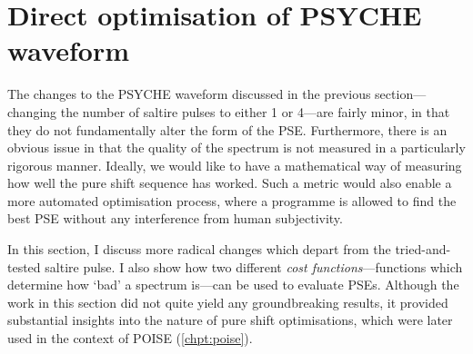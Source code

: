 \section{Direct optimisation of PSYCHE waveform}
\label{sec:pureshift__optimisation}

The changes to the PSYCHE waveform discussed in the previous section---changing the number of saltire pulses to either 1 or 4---are fairly minor, in that they do not fundamentally alter the form of the PSE.
Furthermore, there is an obvious issue in that the quality of the spectrum is not measured in a particularly rigorous manner.
Ideally, we would like to have a mathematical way of measuring how well the pure shift sequence has worked.
Such a metric would also enable a more automated optimisation process, where a programme is allowed to find the best PSE without any interference from human subjectivity.

In this section, I discuss more radical changes which depart from the tried-and-tested saltire pulse.
I also show how two different \textit{cost functions}---functions which determine how `bad' a spectrum is---can be used to evaluate PSEs.
Although the work in this section did not quite yield any groundbreaking results, it provided substantial insights into the nature of pure shift optimisations, which were later used in the context of POISE (\cref{chpt:poise}).




